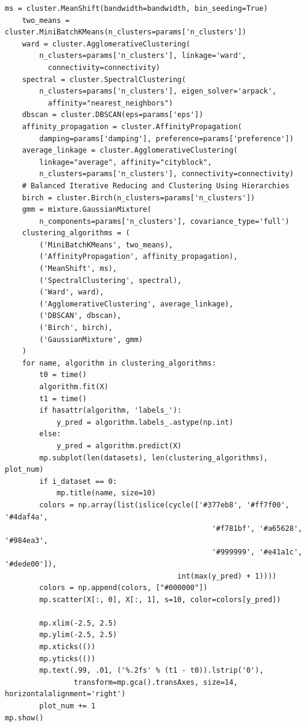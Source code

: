 \documentclass[UTF8]{ctexart}
\begin{document}
\begin{lstlisting}[style=stylePy]
    ms = cluster.MeanShift(bandwidth=bandwidth, bin_seeding=True)
    two_means = cluster.MiniBatchKMeans(n_clusters=params['n_clusters'])
    ward = cluster.AgglomerativeClustering(
        n_clusters=params['n_clusters'], linkage='ward', 
          connectivity=connectivity)
    spectral = cluster.SpectralClustering(
        n_clusters=params['n_clusters'], eigen_solver='arpack', 
          affinity="nearest_neighbors")
    dbscan = cluster.DBSCAN(eps=params['eps'])
    affinity_propagation = cluster.AffinityPropagation(
        damping=params['damping'], preference=params['preference'])
    average_linkage = cluster.AgglomerativeClustering(
        linkage="average", affinity="cityblock",
        n_clusters=params['n_clusters'], connectivity=connectivity)
    # Balanced Iterative Reducing and Clustering Using Hierarchies
    birch = cluster.Birch(n_clusters=params['n_clusters'])
    gmm = mixture.GaussianMixture(
        n_components=params['n_clusters'], covariance_type='full')
    clustering_algorithms = (
        ('MiniBatchKMeans', two_means),
        ('AffinityPropagation', affinity_propagation),
        ('MeanShift', ms),
        ('SpectralClustering', spectral),
        ('Ward', ward),
        ('AgglomerativeClustering', average_linkage),
        ('DBSCAN', dbscan),
        ('Birch', birch),
        ('GaussianMixture', gmm)
    )
    for name, algorithm in clustering_algorithms:
        t0 = time()
        algorithm.fit(X)
        t1 = time()
        if hasattr(algorithm, 'labels_'):
            y_pred = algorithm.labels_.astype(np.int)
        else:
            y_pred = algorithm.predict(X)
        mp.subplot(len(datasets), len(clustering_algorithms), plot_num)
        if i_dataset == 0: 
            mp.title(name, size=10)
        colors = np.array(list(islice(cycle(['#377eb8', '#ff7f00', '#4daf4a',
                                                '#f781bf', '#a65628', '#984ea3',
                                                '#999999', '#e41a1c', '#dede00']),
                                        int(max(y_pred) + 1))))
        colors = np.append(colors, ["#000000"])  
        mp.scatter(X[:, 0], X[:, 1], s=10, color=colors[y_pred])

        mp.xlim(-2.5, 2.5)
        mp.ylim(-2.5, 2.5)
        mp.xticks(())
        mp.yticks(())
        mp.text(.99, .01, ('%.2fs' % (t1 - t0)).lstrip('0'),
                transform=mp.gca().transAxes, size=14, horizontalalignment='right')
        plot_num += 1
mp.show()
\end{lstlisting}
\end{document}
